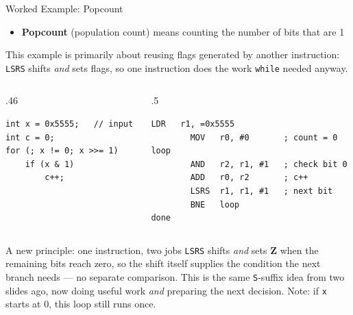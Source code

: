 \documentclass[9pt,aspectratio=169,xcolor=table]{beamer}
\begin{document}
\begin{frame}[fragile]{Worked Example: Popcount}
    \begin{itemize}
        \item \textbf{Popcount} (population count) means counting the number of bits that are 1
    \end{itemize}

    \vspace{1mm}
    {\small This example is primarily about \alert{reusing flags generated by
    another instruction}: \texttt{LSRS} shifts \emph{and} sets flags, so one
    instruction does the work \texttt{while} needed anyway.}

    \vspace{2mm}
    \begin{columns}[T]
    \begin{column}{.46\textwidth}
        \begin{lstlisting}[style=myc]
int x = 0x5555;   // input
int c = 0;
for (; x != 0; x >>= 1)
    if (x & 1)
        c++;
        \end{lstlisting}
    \end{column}
    \begin{column}{.5\textwidth}
        \begin{lstlisting}[style=armasm, language=ARM]
		LDR   r1, =0x5555
		MOV   r0, #0       ; count = 0
loop
		AND   r2, r1, #1   ; check bit 0
		ADD   r0, r2       ; c++
    	LSRS  r1, r1, #1   ; next bit
    	BNE   loop
done
        \end{lstlisting}
    \end{column}
    \end{columns}

    \vspace{3mm}
    \begin{block}{A new principle: one instruction, two jobs}
        \alert{\texttt{LSRS}} shifts \emph{and} sets \textbf{Z} when the
        remaining bits reach zero, so the shift itself supplies the
        condition the next branch needs --- no separate comparison.
        This is the same \texttt{S}-suffix idea from two slides ago,
        now doing useful work \emph{and} preparing the next decision.
        Note: if \texttt{x} starts at 0, this loop still runs once.
    \end{block}
\end{frame}
\end{document}
